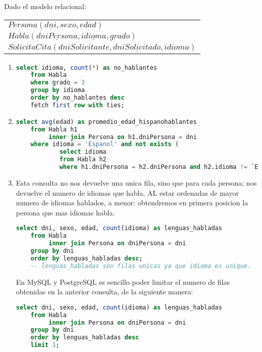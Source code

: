 Dado el modelo relacional:
\begin{center}
	\begin{tabular}{l}
		$Persona(\underline{dni}, sexo, edad)$\\
		$Habla(\underline{dniPersona}, \underline{idioma}, grado)$\\
		$SolicitaCita(\underline{dniSolicitante}, \underline{dniSolicitado}, idioma)$\\	
	\end{tabular}
\end{center}

\begin{enumerate}
	
	\item 
	\begin{lstlisting}[language=sql]
	select idioma, count(*) as no_hablantes
	from Habla
	where grado = 3
	group by idioma
	order by no_hablantes desc
	fetch first row with ties;\end{lstlisting}
	
	\item 
	\begin{lstlisting}[language=sql]
	select avg(edad) as promedio_edad_hispanohablantes
	from Habla h1
		 inner join Persona on h1.dniPersona = dni
	where idioma = 'Espanol' and not exists (
			select idioma
			from Habla h2
			where h1.dniPersona = h2.dniPersona and h2.idioma != `Espanol');\end{lstlisting}
			
	\item 
	Esta consulta no nos devuelve una unica fila, sino que para cada persona; nos devuelve el numero de idiomas que habla. AL estar ordenadas de mayor numero de idiomas hablados, a menor: obtendremos en primera posicion la persona que mas idiomas habla.
	\begin{lstlisting}[language=sql]
	select dni, sexo, edad, count(idioma) as lenguas_habladas
	from Habla
		 inner join Persona on dniPersona = dni
	group by dni
	order by lenguas_habladas desc;
	-- lenguas_habladas son filas unicas ya que idioma es unique.\end{lstlisting}
	
	\newpage
	En MySQL y PostgreSQL es sencillo poder limitar el numero de filas obtenidas en la anterior consulta, de la siguiente manera:
	\begin{lstlisting}[language=sql]
	select dni, sexo, edad, count(idioma) as lenguas_habladas
	from Habla
		 inner join Persona on dniPersona = dni
	group by dni
	order by lenguas_habladas desc
	limit 1;\end{lstlisting}
	

\end{enumerate}

